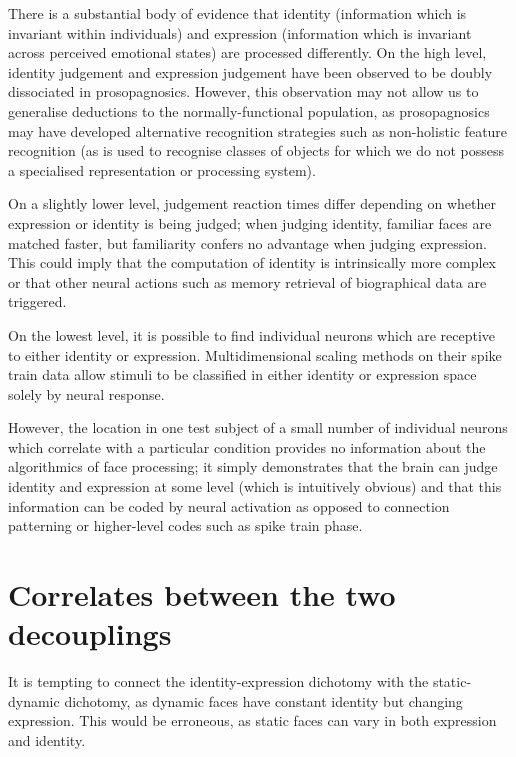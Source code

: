 There is a substantial body of evidence that identity (information which is invariant within individuals) and expression (information which is invariant across perceived emotional states) are processed differently. On the high level, identity judgement and expression judgement have been observed to be doubly dissociated in prosopagnosics\cite{archer1994movement}. However, this observation may not allow us to generalise deductions to the normally-functional population, as prosopagnosics may have developed alternative recognition strategies such as non-holistic feature recognition (as is used to recognise classes of objects for which we do not possess a specialised representation or processing system).

On a slightly lower level, judgement reaction times differ depending on whether expression or identity is being judged; when judging identity, familiar faces are matched faster, but familiarity confers no advantage when judging expression\cite{bruce1986understanding}. This could imply that the computation of identity is intrinsically more complex or that other neural actions such as memory retrieval of biographical data are triggered.

On the lowest level, it is possible to find individual neurons which are receptive to either identity or expression\cite{hasselmo1989role}. Multidimensional scaling methods on their spike train data allow stimuli to be classified in either identity or expression space solely by neural response.

However, the location in one test subject of a small number of individual neurons which correlate with a particular condition provides no information about the algorithmics of face processing; it simply demonstrates that the brain can judge identity and expression at some level (which is intuitively obvious) and that this information can be coded by neural activation as opposed to connection patterning or higher-level codes such as spike train phase.

\section{Correlates between the two decouplings}

It is tempting to connect the identity-expression dichotomy with the static-dynamic dichotomy, as dynamic faces have constant identity but changing expression. This would be erroneous, as static faces can vary in both expression and identity.